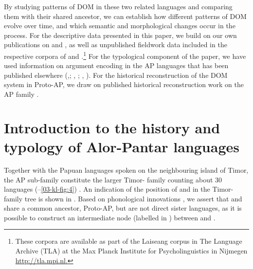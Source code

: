 \documentclass[output=paper]{LSP/langsci}
\begin{document}
By studying patterns of DOM in these two related languages and comparing them with their shared ancestor, we can establish how different patterns of DOM evolve over time, and which semantic and morphological changes occur in the process. For the descriptive data presented in this paper, we build on our own publications on  and , as well as unpublished fieldwork data included in the respective corpora of  and .\footnote{These corpora are available as part of the Laiseang corpus in The Language Archive (TLA) at the Max Planck Institute for Psycholinguistics in Nijmegen \url{http://tla.mpi.nl.}} For the typological component of the paper, we have used information on argument encoding in the AP languages that has been published elsewhere (\eg \citealt{Klamer2010Ditransitive,
Klamer2010One},\citeyear*{Klamer2017Alor-Pantar};
\citeauthor{Kratochvil2011Transitivity} \citeyear*{Kratochvil2011Transitivity},
\citeyear*{Kratochvil2014Differential};
\citealt{Klameretal2012Role,
Klameretal2012Give,
Feddenetal2013Feddenetal,
Feddenetal2014Variation},
\citeauthor{Kratochviletal2015Definiteness} \citeyear*{Kratochviletal2015Definiteness,Kratochviletal2015Degrees}). 
For the historical reconstruction of the DOM system in Proto-AP, we draw on published historical reconstruction work on the AP family \citep{Holtonetal2012Historical,Holtonetal2017Linguistic,Holtonetal2017Internal,}.

\section{Introduction to the history and typology of Alor-Pantar languages}
\label{03-kl-sec:2}

Together with the Papuan languages spoken on the neighbouring island of Timor, the AP sub-family constitute the larger Timor- family counting about 30 languages (--\ref{03-kl-fig:4})
\citep{Holtonetal2012Historical,Holtonetal2017Linguistic,Holtonetal2017Internal,Robinsonetal2014Reconstructing,Schapper2014Kamang,Schapperetal2017Relatedness}. 
An indication of the position of  and  in the Timor- family tree is shown in . 
Based on phonological innovations \citep{Holtonetal2012Historical}, we assert that  and  share a common ancestor, Proto-AP, but are not direct sister languages, as it is possible to construct an intermediate node (labelled  in ) between  and .
\end{document}
